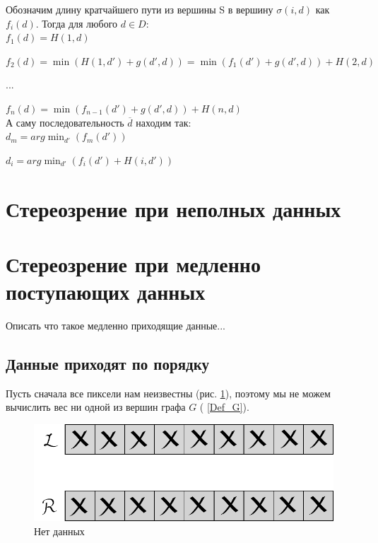 	Обозначим длину кратчайшего пути из вершины S в вершину $\sigma(i, d)$ как $f_i(d)$. 
	Тогда для любого $d \in D$:\\
	
		$f_1(d) = H(1, d)$
		
		$f_2(d) = \min(H(1,d') + g(d', d)) = \min(f_1(d') + g(d', d)) + H(2,d)$
		
	 	...
	 	
	 	$f_n(d) = \min(f_{n-1}(d') + g(d', d)) + H(n,d)$\\

	А саму последовательность $\overline{d}$ находим так:\\
	
		$d_m = arg\min_{d'} (f_m(d'))$
		
		$d_i = arg\min_{d'} (f_i(d') + H(i,d'))$	
\section{Стереозрение при неполных данных}
\newpage

\section{Стереозрение при медленно поступающих данных}

Описать что такое медленно приходящие данные...

\subsection{Данные приходят по порядку}
Пусть сначала все пиксели нам неизвестны (рис. \ref{1.4_im_nodata}), поэтому мы не можем вычислить вес ни одной из вершин графа $G$ ( \ref{Def_G}).
\begin{figure}[h!]
	\centering
	\includegraphics[scale = 0.7]{allclosed2.pdf}
	\caption{Нет данных}
	\label{1.4_im_nodata}
\end{figure}

